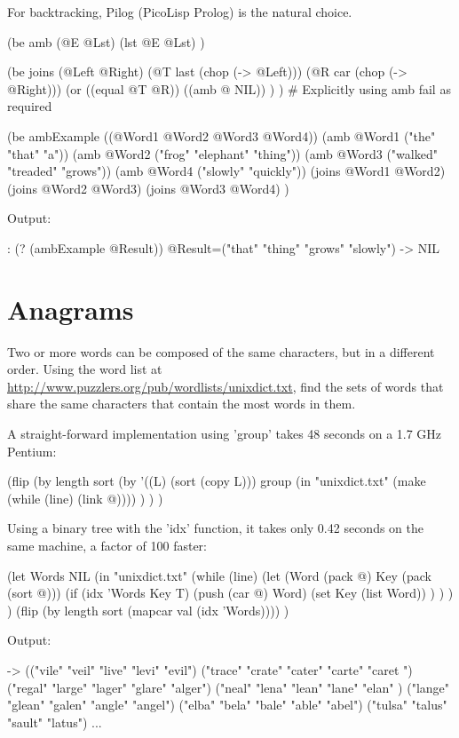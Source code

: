 \begin{wideverbatim}

For backtracking, Pilog (PicoLisp Prolog) is the natural choice.

(be amb (@E @Lst)
   (lst @E @Lst) )

(be joins (@Left @Right)
   (@T last (chop (-> @Left)))
   (@R car (chop (-> @Right)))
   (or
      ((equal @T @R))
      ((amb @ NIL)) ) )  # Explicitly using amb fail as required

(be ambExample ((@Word1 @Word2 @Word3 @Word4))
  (amb @Word1 ("the" "that" "a"))
  (amb @Word2 ("frog" "elephant" "thing"))
  (amb @Word3 ("walked" "treaded" "grows"))
  (amb @Word4 ("slowly" "quickly"))
  (joins @Word1 @Word2)
  (joins @Word2 @Word3)
  (joins @Word3 @Word4) )

Output:

: (? (ambExample @Result))
 @Result=("that" "thing" "grows" "slowly")
-> NIL

\end{wideverbatim}

\pagebreak{}
\section*{Anagrams}

Two or more words can be composed of the same characters, but in a
different order. Using the word list at
\href{http://www.puzzlers.org/pub/wordlists/unixdict.txt}{http://www.puzzlers.org/pub/wordlists/unixdict.txt},
find the sets of words that share the same characters that contain the
most words in them.


\begin{wideverbatim}

A straight-forward implementation using 'group' takes 48 seconds
on a 1.7 GHz Pentium:

(flip
   (by length sort
      (by '((L) (sort (copy L))) group
         (in "unixdict.txt" (make (while (line) (link @)))) ) ) )

Using a binary tree with the 'idx' function, it takes only 0.42 seconds
on the same machine, a factor of 100 faster:

(let Words NIL
   (in "unixdict.txt"
      (while (line)
         (let (Word (pack @)  Key (pack (sort @)))
            (if (idx 'Words Key T)
               (push (car @) Word)
               (set Key (list Word)) ) ) ) )
   (flip (by length sort (mapcar val (idx 'Words)))) )

Output:

-> (("vile" "veil" "live" "levi" "evil") ("trace" "crate" "cater" "carte" "caret
") ("regal" "large" "lager" "glare" "alger") ("neal" "lena" "lean" "lane" "elan"
) ("lange" "glean" "galen" "angle" "angel") ("elba" "bela" "bale" "able" "abel")
 ("tulsa" "talus" "sault" "latus") ...

\end{wideverbatim}

